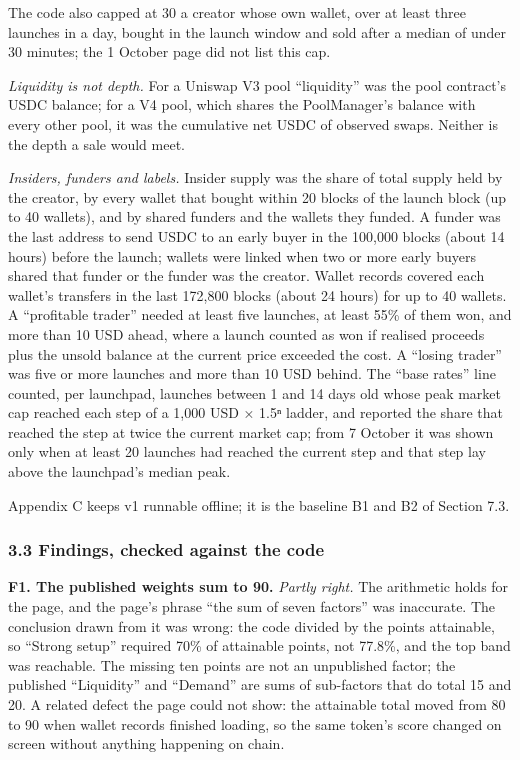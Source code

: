 The code also capped at 30 a creator whose own wallet, over at least three launches in a day, bought in the launch window and sold after a median of under 30 minutes; the 1 October page did not list this cap.

\emph{Liquidity is not depth.} For a Uniswap V3 pool ``liquidity'' was the pool contract's USDC balance; for a V4 pool, which shares the PoolManager's balance with every other pool, it was the cumulative net USDC of observed swaps. Neither is the depth a sale would meet.

\emph{Insiders, funders and labels.} Insider supply was the share of total supply held by the creator, by every wallet that bought within 20 blocks of the launch block (up to 40 wallets), and by shared funders and the wallets they funded. A funder was the last address to send USDC to an early buyer in the 100,000 blocks (about 14 hours) before the launch; wallets were linked when two or more early buyers shared that funder or the funder was the creator. Wallet records covered each wallet's transfers in the last 172,800 blocks (about 24 hours) for up to 40 wallets. A ``profitable trader'' needed at least five launches, at least 55\% of them won, and more than 10 USD ahead, where a launch counted as won if realised proceeds plus the unsold balance at the current price exceeded the cost. A ``losing trader'' was five or more launches and more than 10 USD behind. The ``base rates'' line counted, per launchpad, launches between 1 and 14 days old whose peak market cap reached each step of a 1,000 USD × 1.5ⁿ ladder, and reported the share that reached the step at twice the current market cap; from 7 October it was shown only when at least 20 launches had reached the current step and that step lay above the launchpad's median peak.

Appendix C keeps v1 runnable offline; it is the baseline B1 and B2 of Section 7.3.

\subsubsection{3.3 Findings, checked against the code}\label{findings-checked-against-the-code}

\textbf{F1. The published weights sum to 90.} \emph{Partly right.} The arithmetic holds for the page, and the page's phrase ``the sum of seven factors'' was inaccurate. The conclusion drawn from it was wrong: the code divided by the points attainable, so ``Strong setup'' required 70\% of attainable points, not 77.8\%, and the top band was reachable. The missing ten points are not an unpublished factor; the published ``Liquidity'' and ``Demand'' are sums of sub-factors that do total 15 and 20. A related defect the page could not show: the attainable total moved from 80 to 90 when wallet records finished loading, so the same token's score changed on screen without anything happening on chain.

